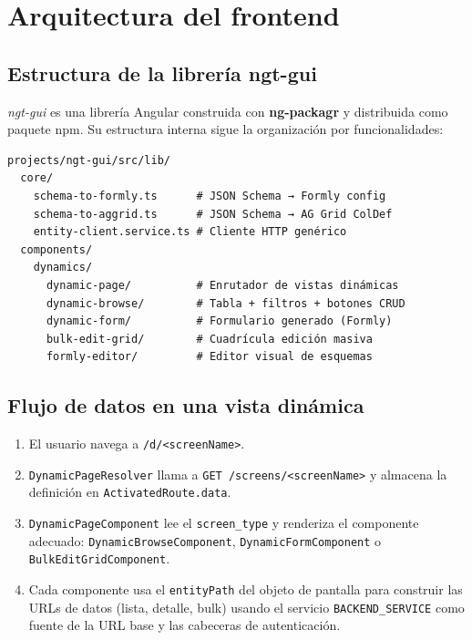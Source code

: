 \section{Arquitectura del frontend}
\label{sec:arch-frontend}

\subsection{Estructura de la librería ngt-gui}
\label{subsec:ngtgui-estructura}

\textit{ngt-gui} es una librería Angular construida con \textbf{ng-packagr} y distribuida
como paquete npm. Su estructura interna sigue la organización por funcionalidades:

\begin{verbatim}
projects/ngt-gui/src/lib/
  core/
    schema-to-formly.ts      # JSON Schema → Formly config
    schema-to-aggrid.ts      # JSON Schema → AG Grid ColDef
    entity-client.service.ts # Cliente HTTP genérico
  components/
    dynamics/
      dynamic-page/          # Enrutador de vistas dinámicas
      dynamic-browse/        # Tabla + filtros + botones CRUD
      dynamic-form/          # Formulario generado (Formly)
      bulk-edit-grid/        # Cuadrícula edición masiva
      formly-editor/         # Editor visual de esquemas
\end{verbatim}

\subsection{Flujo de datos en una vista dinámica}
\label{subsec:flujo-datos}

\begin{enumerate}
  \item El usuario navega a \texttt{/d/<screenName>}.
  \item \texttt{DynamicPageResolver} llama a \texttt{GET /screens/<screenName>} y
    almacena la definición en \texttt{ActivatedRoute.data}.
  \item \texttt{DynamicPageComponent} lee el \texttt{screen\_type} y renderiza el
    componente adecuado: \texttt{DynamicBrowseComponent}, \texttt{DynamicFormComponent}
    o \texttt{BulkEditGridComponent}.
  \item Cada componente usa el \texttt{entityPath} del objeto de pantalla para
    construir las URLs de datos (lista, detalle, bulk) usando el servicio
    \texttt{BACKEND\_SERVICE} como fuente de la URL base y las cabeceras de
    autenticación.
\end{enumerate}

